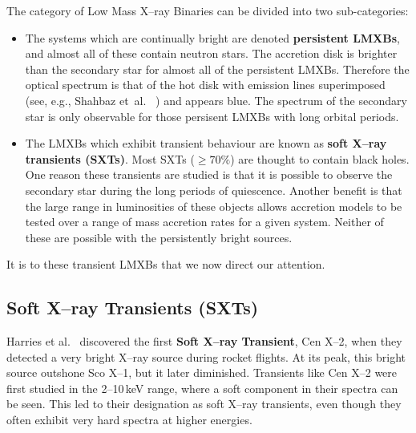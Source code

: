 \vspace{\myparskip}

The category of Low Mass X--ray Binaries can be divided into two
sub-categories:

\begin{itemize}
\item %
The systems which are continually bright are denoted
\textbf{persistent LMXBs}, and almost all of these contain neutron stars. %
The accretion disk is brighter than the secondary star for almost all of the persistent
LMXBs. Therefore the optical spectrum is that of the hot disk with emission lines superimposed (see, e.g., Shahbaz et~al.\ %
%
) and appears blue. The spectrum of the secondary star is only
observable for those persisent LMXBs with long orbital periods. %

\item %
The LMXBs which exhibit transient behaviour are known as \textbf{soft
X--ray transients (SXTs)}. Most SXTs ($\geq 70\%$) are thought to contain black holes. 
One reason these transients are studied is that it is possible to observe the secondary star during the long periods of quiescence. Another benefit is that the large range in
luminosities of these objects allows accretion models to be tested
over a range of mass accretion rates for a given system. Neither of these are possible with the persistently bright sources. %


\end{itemize}
It is to these transient LMXBs that we now direct our attention. %



\subsection{Soft X--ray Transients (SXTs)}
\label{cha:Introduction:sec:X--rayBinaries:subsec:SXTs}

Harries et al.\ %
\citeyear{Harries_et_al.:1967} %
discovered the first \textbf{Soft X--ray Transient}, %
Cen X--2, when they detected a very bright X--ray source %
during rocket flights. %
At its peak, this bright source outshone Sco X--1, but it later
diminished. Transients like Cen X--2 were first studied in the 2--10\,keV range, where a
soft component in their spectra can be seen. This led to their
designation as soft X--ray transients, even though they often exhibit
very hard spectra at higher energies. %

